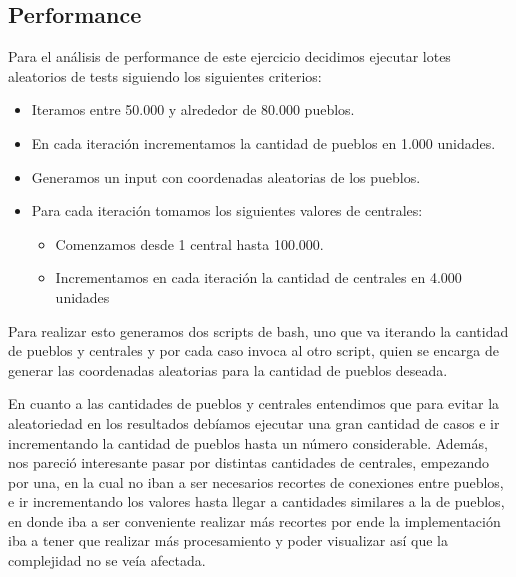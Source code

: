 \subsection{Performance}

Para el an\'alisis de performance de este ejercicio decidimos ejecutar lotes aleatorios de tests siguiendo los siguientes criterios:

\begin{itemize}
	\item Iteramos entre 50.000 y alrededor de 80.000 pueblos.
	\item En cada iteraci\'on incrementamos la cantidad de pueblos en 1.000 unidades.
	\item Generamos un input con coordenadas aleatorias de los pueblos.
	\item Para cada iteraci\'on tomamos los siguientes valores de centrales:
	\begin{itemize}
		\item Comenzamos desde 1 central hasta 100.000.
		\item Incrementamos en cada iteraci\'on la cantidad de centrales en 4.000 unidades
	\end{itemize}
\end{itemize}

Para realizar esto generamos dos scripts de bash, uno que va iterando la cantidad de pueblos y centrales y por cada caso invoca al otro script, quien se encarga de generar las coordenadas aleatorias para la cantidad de pueblos deseada.

En cuanto a las cantidades de pueblos y centrales entendimos que para evitar la aleatoriedad en los resultados deb\'iamos ejecutar una gran cantidad de casos e ir incrementando la cantidad de pueblos hasta un n\'umero considerable. 
Adem\'as, nos pareci\'o interesante pasar por distintas cantidades de centrales, empezando por una, en la cual no iban a ser necesarios recortes de conexiones entre pueblos, e ir incrementando los valores hasta llegar a cantidades similares a la de pueblos, en donde iba a ser conveniente realizar m\'as recortes por ende la implementaci\'on iba a tener que realizar m\'as procesamiento y poder visualizar as\'i que la complejidad no se ve\'ia afectada.

